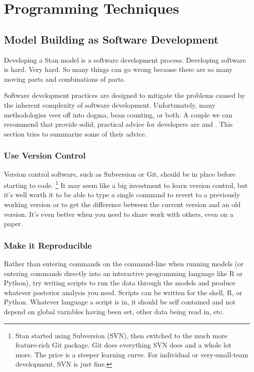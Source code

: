 \part{Programming Techniques}\label{programming-techniques.part}


\chapter{Model Building as Software Development}

\noindent
Developing a Stan model is a software development process.  Developing
software is hard.  Very hard.  So many things can go wrong because
there are so many moving parts and combinations of parts.  

Software development practices are designed to mitigate the problems
caused by the inherent complexity of software development.
Unfortunately, many methodologies veer off into dogma, bean counting,
or both.  A couple we can recommend that provide solid, practical
advice for developers are \citep{HuntThomas:99} and
\citep{McConnell:2004}.  This section tries to summarize some of their
advice.

\section{Use Version Control}

Version control software, such as Subversion or Git, should be in
place before starting to code.%
%
\footnote{Stan started using Subversion (SVN), then switched to the
  much more feature-rich Git package.  Git does everything SVN does
  and a whole lot more.  The price is a steeper learning curve.  For
  individual or very-small-team development, SVN is just fine.}
%
It may seem like a big investment to learn version control, but it's
well worth it to be able to type a single command to revert to a
previously working version or to get the difference between the
current version and an old version.  It's even better when you need
to share work with others, even on a paper.


\section{Make it Reproducible}

Rather than entering commands on the command-line when running models
(or entering commands directly into an interactive programming
language like R or Python), try writing scripts to run the data
through the models and produce whatever posterior analysis you need.
Scripts can be written for the shell, R, or Python.  Whatever language
a script is in, it should be self contained and not depend on global
variables having been set, other data being read in, etc.  

